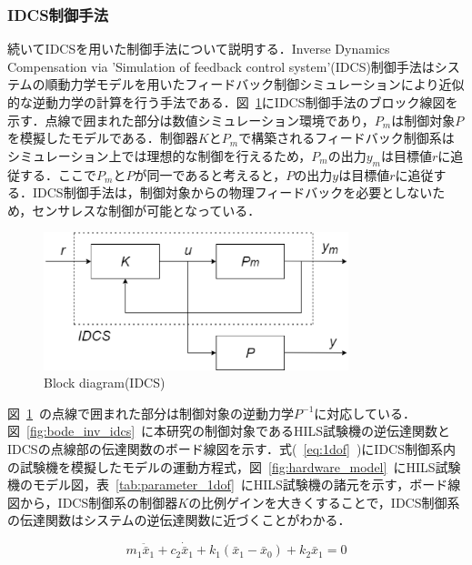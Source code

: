 \documentclass[a4paper,12pt]{article_vdlab_sotsuron}
\begin{document}
\subsubsection{IDCS制御手法}
\label{sec:sub_method_idcs}
続いてIDCSを用いた制御手法について説明する．Inverse Dynamics Compensation via 'Simulation of feedback control system'(IDCS)制御手法はシステムの順動力学モデルを用いたフィードバック制御シミュレーションにより近似的な逆動力学の計算を行う手法である\cite{method_idcs}．図~\ref{fig:idcs_block}にIDCS制御手法のブロック線図を示す．点線で囲まれた部分は数値シミュレーション環境であり，$P_m$は制御対象$P$を模擬したモデルである．制御器$K$と$P_m$で構築されるフィードバック制御系はシミュレーション上では理想的な制御を行えるため，$P_m$の出力$y_m$は目標値$r$に追従する．ここで$P_m$と$P$が同一であると考えると，$P$の出力$y$は目標値$r$に追従する．IDCS制御手法は，制御対象からの物理フィードバックを必要としないため，センサレスな制御が可能となっている．

\vspace*{10mm}
\begin{figure}[htp]
  \begin{center}
    \includegraphics[height=40mm]{figure/idcs_block.eps}
    \vspace*{3mm}
    \caption{Block diagram(IDCS)}
    \label{fig:idcs_block}
  \end{center}
\end{figure}

\newpage

図~\ref{fig:idcs_block}~の点線で囲まれた部分は制御対象の逆動力学$P^{-1}$に対応している．図~\ref{fig:bode_inv_idcs}~に本研究の制御対象であるHILS試験機の逆伝達関数とIDCSの点線部の伝達関数のボード線図を示す．式(~\ref{eq:1dof}~)にIDCS制御系内の試験機を模擬したモデルの運動方程式，図~\ref{fig:hardware_model}~にHILS試験機のモデル図，表~\ref{tab:parameter_1dof}~にHILS試験機の諸元を示す，ボード線図から，IDCS制御系の制御器$K$の比例ゲインを大きくすることで，IDCS制御系の伝達関数はシステムの逆伝達関数に近づくことがわかる．

\begin{equation}
  m_1\ddot{\bar{x}}_1+c_2\dot{\bar{x}}_1+k_1(\bar{x}_1-\bar{x}_0)+k_2\bar{x}_1=0 \label{eq:1dof}
\end{equation}
\end{document}
